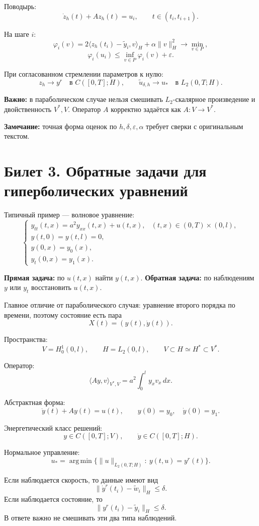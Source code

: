 \documentclass[12pt,a4paper]{article}
\begin{document}
Поводырь:
\[
\dot z_h(t)+Az_h(t)=u_i,\qquad t\in(t_i,t_{i+1}).
\]

На шаге \(i\):
\[
\varphi_i(v)=
2\langle z_h(t_i)-\tilde y_i,v\rangle_H+\alpha\|v\|_H^2
\to\min_{v\in P},
\]
\[
\varphi_i(u_i)\le \inf_{v\in P}\varphi_i(v)+\varepsilon.
\]

При согласованном стремлении параметров к нулю:
\[
z_h\to y^r \quad \text{в } C([0,T];H),
\qquad
\tilde u_{\delta,h}\to u_* \quad \text{в } L_2(0,T;H).
\]

\textbf{Важно:} в параболическом случае нельзя смешивать \(L_2\)-скалярное произведение и двойственность \(V^*,V\). Оператор \(A\) корректно задаётся как \(A:V\to V^*\).

\textbf{Замечание:} точная форма оценок по \(h,\delta,\varepsilon,\alpha\) требует сверки с оригинальным текстом.

\section*{Билет 3. Обратные задачи для гиперболических уравнений}

Типичный пример --- волновое уравнение:
\[
\begin{cases}
y_{tt}(t,x)=a^2y_{xx}(t,x)+u(t,x), &(t,x)\in(0,T)\times(0,l),\\
y(t,0)=y(t,l)=0,\\
y(0,x)=y_0(x),\\
y_t(0,x)=y_1(x).
\end{cases}
\]

\textbf{Прямая задача:} по \(u(t,x)\) найти \(y(t,x)\).  
\textbf{Обратная задача:} по наблюдениям \(y\) или \(y_t\) восстановить \(u(t,x)\).

Главное отличие от параболического случая: уравнение второго порядка по времени, поэтому состояние есть пара
\[
X(t)=(y(t),\dot y(t)).
\]

Пространства:
\[
V=H_0^1(0,l),\qquad H=L_2(0,l),\qquad
V\subset H\simeq H^*\subset V^*.
\]

Оператор:
\[
\langle Ay,v\rangle_{V^*,V}
=
a^2\int_0^l y_xv_x\,dx.
\]

Абстрактная форма:
\[
\ddot y(t)+Ay(t)=u(t),
\qquad
y(0)=y_0,\quad \dot y(0)=y_1.
\]

Энергетический класс решений:
\[
y\in C([0,T];V),\qquad
\dot y\in C([0,T];H).
\]

Нормальное управление:
\[
u_*=\operatorname*{arg\,min}\{\|u\|_{L_2(0,T;H)}:\ y(t,u)=y^r(t)\}.
\]

Если наблюдается скорость, то данные имеют вид
\[
\|\dot y^r(t_i)-\tilde w_i\|_H\le\delta.
\]
Если наблюдается состояние, то
\[
\|y^r(t_i)-\tilde y_i\|_H\le\delta.
\]
В ответе важно не смешивать эти два типа наблюдений.
\end{document}
